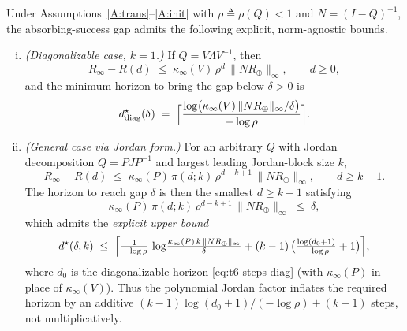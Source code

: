 \begin{proposition}
\label{thm:mixing}
Under Assumptions~\ref{A:trans}--\ref{A:init} with $\rho\triangleq
\rho(Q)<1$ and $N=(I-Q)^{-1}$, the absorbing-success gap admits the
following explicit, norm-agnostic bounds.
\begin{enumerate}[(i)]
\item \emph{(Diagonalizable case, $k=1$.)} If $Q = V\Lambda V^{-1}$,
then
\begin{equation}
R_\infty - R(d)
  \;\le\; \kappa_\infty(V)\,\rho^{d}\,\bigl\|N R_\oplus\bigr\|_\infty,
  \qquad d\ge 0,
\label{eq:t6-diag}
\end{equation}
and the minimum horizon to bring the gap below $\delta>0$ is
\begin{equation}
  d^\star_{\mathrm{diag}}(\delta)
  \;=\;
  \Bigl\lceil
   \frac{\log\bigl(\kappa_\infty(V)\,\|NR_\oplus\|_\infty / \delta\bigr)}{-\log\rho}
  \Bigr\rceil.
\label{eq:t6-steps-diag}
\end{equation}

\item \emph{(General case via Jordan form.)} For an arbitrary $Q$
with Jordan decomposition $Q=PJP^{-1}$ and largest leading
Jordan-block size $k$,
\begin{equation}
R_\infty - R(d)
  \;\le\;
  \kappa_\infty(P)\,\pi(d;k)\,\rho^{d-k+1}\,\bigl\|N R_\oplus\bigr\|_\infty,
  \qquad d\ge k-1.
\label{eq:t6-jordan}
\end{equation}
The horizon to reach gap $\delta$ is then the smallest $d\ge k-1$
satisfying
\begin{equation}
\kappa_\infty(P)\,\pi(d;k)\,\rho^{d-k+1}\,\|NR_\oplus\|_\infty \;\le\; \delta,
\label{eq:t6-steps-jordan}
\end{equation}
which admits the \emph{explicit upper bound}
\begin{equation}
  d^\star(\delta,k)
  \;\le\;
  \Bigl\lceil
    \tfrac{1}{-\log\rho}\,\log\!\tfrac{\kappa_\infty(P)\,k\,\|NR_\oplus\|_\infty}{\delta}
    + (k-1)\,\bigl(\tfrac{\log(d_0+1)}{-\log\rho}+1\bigr)
  \Bigr\rceil,
\label{eq:t6-jordan-bound}
\end{equation}
where $d_0$ is the diagonalizable horizon \eqref{eq:t6-steps-diag}
(with $\kappa_\infty(P)$ in place of $\kappa_\infty(V)$). Thus the
polynomial Jordan factor inflates the required horizon by an additive
$(k{-}1)\log(d_0{+}1)/(-\log\rho) + (k{-}1)$ steps, not multiplicatively.
\end{enumerate}
\end{proposition}

